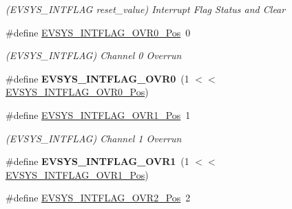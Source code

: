 \begin{DoxyCompactItemize}
\begin{DoxyCompactList}\small\item\em (E\+V\+S\+Y\+S\+\_\+\+I\+N\+T\+F\+L\+A\+G reset\+\_\+value) Interrupt Flag Status and Clear \end{DoxyCompactList}\item 
\hypertarget{group___s_a_m_l21___e_v_s_y_s_gab75b21387d046ad691547df25609c238}{}\#define \hyperlink{group___s_a_m_l21___e_v_s_y_s_gab75b21387d046ad691547df25609c238}{E\+V\+S\+Y\+S\+\_\+\+I\+N\+T\+F\+L\+A\+G\+\_\+\+O\+V\+R0\+\_\+\+Pos}~0\label{group___s_a_m_l21___e_v_s_y_s_gab75b21387d046ad691547df25609c238}

\begin{DoxyCompactList}\small\item\em (E\+V\+S\+Y\+S\+\_\+\+I\+N\+T\+F\+L\+A\+G) Channel 0 Overrun \end{DoxyCompactList}\item 
\hypertarget{group___s_a_m_l21___e_v_s_y_s_ga8acf6fc18b2c25d9486ff64bdec294ba}{}\#define {\bfseries E\+V\+S\+Y\+S\+\_\+\+I\+N\+T\+F\+L\+A\+G\+\_\+\+O\+V\+R0}~(1 $<$$<$ \hyperlink{group___s_a_m_l21___e_v_s_y_s_gab75b21387d046ad691547df25609c238}{E\+V\+S\+Y\+S\+\_\+\+I\+N\+T\+F\+L\+A\+G\+\_\+\+O\+V\+R0\+\_\+\+Pos})\label{group___s_a_m_l21___e_v_s_y_s_ga8acf6fc18b2c25d9486ff64bdec294ba}

\item 
\hypertarget{group___s_a_m_l21___e_v_s_y_s_ga49ebe295e782e28a7ac0e5eed1a7da33}{}\#define \hyperlink{group___s_a_m_l21___e_v_s_y_s_ga49ebe295e782e28a7ac0e5eed1a7da33}{E\+V\+S\+Y\+S\+\_\+\+I\+N\+T\+F\+L\+A\+G\+\_\+\+O\+V\+R1\+\_\+\+Pos}~1\label{group___s_a_m_l21___e_v_s_y_s_ga49ebe295e782e28a7ac0e5eed1a7da33}

\begin{DoxyCompactList}\small\item\em (E\+V\+S\+Y\+S\+\_\+\+I\+N\+T\+F\+L\+A\+G) Channel 1 Overrun \end{DoxyCompactList}\item 
\hypertarget{group___s_a_m_l21___e_v_s_y_s_ga9f3fba1ba61484c1fe264514ba7bf901}{}\#define {\bfseries E\+V\+S\+Y\+S\+\_\+\+I\+N\+T\+F\+L\+A\+G\+\_\+\+O\+V\+R1}~(1 $<$$<$ \hyperlink{group___s_a_m_l21___e_v_s_y_s_ga49ebe295e782e28a7ac0e5eed1a7da33}{E\+V\+S\+Y\+S\+\_\+\+I\+N\+T\+F\+L\+A\+G\+\_\+\+O\+V\+R1\+\_\+\+Pos})\label{group___s_a_m_l21___e_v_s_y_s_ga9f3fba1ba61484c1fe264514ba7bf901}

\item 
\hypertarget{group___s_a_m_l21___e_v_s_y_s_ga2f068982e90e4b6e331591b488da07a0}{}\#define \hyperlink{group___s_a_m_l21___e_v_s_y_s_ga2f068982e90e4b6e331591b488da07a0}{E\+V\+S\+Y\+S\+\_\+\+I\+N\+T\+F\+L\+A\+G\+\_\+\+O\+V\+R2\+\_\+\+Pos}~2\label{group___s_a_m_l21___e_v_s_y_s_ga2f068982e90e4b6e331591b488da07a0}


\end{DoxyCompactItemize}
